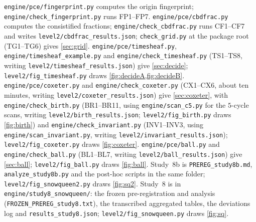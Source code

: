 \documentclass[11pt]{article}
\theoremstyle{definition}\newtheorem{definition}[theorem]{Definition}\newtheorem{remark}[theorem]{Remark}\newtheorem{example}[theorem]{Example}
\begin{document}
\texttt{engine/pce/fingerprint.py} computes the origin fingerprint; \texttt{engine/check\_fingerprint.py} runs FP1--FP7. \texttt{engine/pce/cbdfrac.py} computes the consistified fractions; \texttt{engine/check\_cbdfrac.py} runs CF1--CF7 and writes \texttt{level2/cbdfrac\_results.json}; \texttt{check\_grid.py} at the package root (TG1--TG6) gives \cref{sec:grid}. \texttt{engine/pce/timesheaf.py}, \texttt{engine/timesheaf\_example.py} and \texttt{engine/check\_timesheaf.py} (TS1--TS8, writing \texttt{level2/timesheaf\_results.json}) give \cref{sec:decide}; \texttt{level2/fig\_timesheaf.py} draws \cref{fig:decideA,fig:decideB}. \texttt{engine/pce/coxeter.py} and \texttt{engine/check\_coxeter.py} (CX1--CX6, about ten minutes, writing \texttt{level2/coxeter\_results.json}) give \cref{sec:coxeter}, with \texttt{engine/check\_birth.py} (BR1--BR11, using \texttt{engine/scan\_c5.py} for the $5$-cycle scans, writing \texttt{level2/birth\_results.json}; \texttt{level2/fig\_birth.py} draws \cref{fig:birth}) and \texttt{engine/check\_invariant.py} (INV1--INV3, using \texttt{engine/scan\_invariant.py}, writing \texttt{level2/invariant\_results.json}); \texttt{level2/fig\_coxeter.py} draws \cref{fig:coxeter}. \texttt{engine/pce/ball.py} and \texttt{engine/check\_ball.py} (BL1--BL7, writing \texttt{level2/ball\_results.json}) give \cref{sec:ball}; \texttt{level2/fig\_ball.py} draws \cref{fig:ball}. Study~8b is \texttt{PREREG\_study8b.md}, \texttt{analyze\_study8b.py} and the post-hoc scripts in the same folder; \texttt{level2/fig\_snowqueen2.py} draws \cref{fig:sq2}. Study~8 is in
\texttt{engine/study8\_snowqueen/}: the frozen pre-registration and analysis (\texttt{FROZEN\_PREREG\_study8.txt}), the transcribed
aggregated tables, the deviations log and \texttt{results\_study8.json}; \texttt{level2/fig\_snowqueen.py} draws \cref{fig:sq}.
\end{document}
